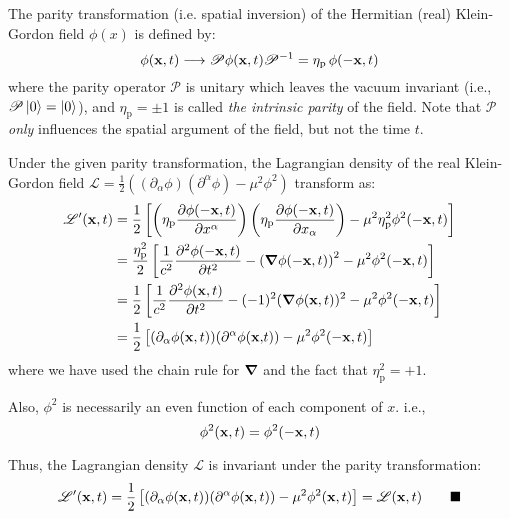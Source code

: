 \documentclass[letterpaper,12pt]{article}
\newenvironment{problem}{\subsection{}\begin{adjustwidth}{0.25in}{}\vspace{-\baselineskip}}{\end{adjustwidth}}
\newcommand{\pder}[2]{\frac{\partial #1}{\partial #2}}
\newcommand{\npder}[3]{\frac{\partial^#1 #2}{\partial #3^#1}}
\newcommand{\lagr}{\mathscr{L}}
\newcommand{\done}{\tag*{$\blacksquare$}}
\begin{document}
\begin{problem}
The parity transformation (i.e. spatial inversion) of the Hermitian (real) Klein-Gordon field $\phi(x)$ is defined by:
\begin{equation*}
	\phi(\vb{x},t) \longrightarrow \mathscr{P}\phi(\vb{x},t)\mathscr{P}^{-1} = \eta_\text{p} \, \phi(-\vb{x},t)
\end{equation*}
where the parity operator $\mathscr{P}$ is unitary which leaves the vacuum invariant (i.e., $\mathscr{P}\ket{0} = \ket{0}$), and $\eta_\text{p} = \pm1$ is called \emph{the intrinsic parity} of the field. Note that $\mathscr{P}$ \emph{only} influences the spatial argument of the field, but not the time $t$.

Under the given parity transformation, the Lagrangian density of the real Klein-Gordon field $\lagr = \frac{1}{2} \left((\partial_\alpha \phi)(\partial^\alpha \phi) - \mu^2\phi^2\right)$ transform as:
\begin{align*}
	\lagr'(\vb{x},t) &= \frac{1}{2} \left[\left(\eta_\text{p}\pder{\phi(-\vb{x},t)}{x^\alpha}\right)\left(\eta_\text{p}\pder{\phi(-\vb{x},t)}{x_\alpha}\right) - \mu^2 \eta_\text{p}^2 \phi^2(-\vb{x},t) \right]	\\
	&= \frac{\eta_\text{p}^2}{2}\left[\frac{1}{c^2}\npder{2}{\phi(-\vb{x},t)}{t} - \left(\grad{\phi(-\vb{x},t)}\right)^2 - \mu^2\phi^2(-\vb{x},t)\right]	\\
	&= \frac{1}{2} \left[\frac{1}{c^2}\npder{2}{\phi(\vb{x},t)}{t} - (-1)^2(\grad{\phi(\vb{x},t)})^2 - \mu^2\phi^2(-\vb{x},t)\right]	\\
	&= \frac{1}{2} \left[(\partial_\alpha \phi(\vb{x},t))(\partial^\alpha \phi(\vb{x,}t)) - \mu^2\phi^2(-\vb{x},t)\right]
\end{align*}
where we have used the chain rule for $\grad$ and the fact that $\eta_\text{p}^2=+1$.

Also, $\phi^2$ is necessarily an even function of each component of $x$. i.e.,
\begin{equation*}
	\phi^2(\vb{x},t) = \phi^2(-\vb{x},t)
\end{equation*}

Thus, the Lagrangian density $\lagr$ is invariant under the parity transformation:
\begin{equation*}
	\lagr'(\vb{x},t) = \frac{1}{2}\left[(\partial_\alpha \phi(\vb{x},t))(\partial^\alpha \phi(\vb{x},t)) - \mu^2\phi^2(\vb{x},t)\right] = \lagr(\vb{x},t)		\done
\end{equation*}


\end{problem}
\end{document}
